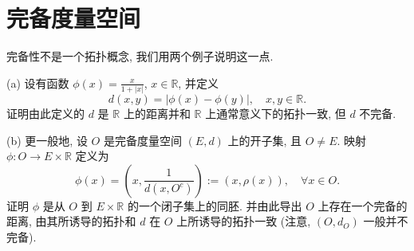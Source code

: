\chapter{完备度量空间}
\thispagestyle{empty}



\begin{exercise}
    完备性不是一个拓扑概念, 我们用两个例子说明这一点.

    (a) 设有函数 $\phi(x)=\frac{x}{1+|x|}$, $x\in\mathbb{R}$, 并定义
    \[d(x,y)=|\phi(x)-\phi(y)|,\quad x,y\in\mathbb{R}.\]
    证明由此定义的 $d$ 是 $\mathbb{R}$ 上的距离并和 $\mathbb{R}$ 上通常意义下的拓扑一致,
    但 $d$ 不完备.

    (b) 更一般地, 设 $O$ 是完备度量空间 $(E,d)$ 上的开子集, 且 $O\neq E$.
    映射 $\phi:O\to E\times\mathbb{R}$ 定义为
    \[\phi(x)=\left(x,\frac{1}{d(x,O^c)}\right):=(x,\rho(x)),\quad\forall x\in O.\]
    证明 $\phi$ 是从 $O$ 到 $E\times\mathbb{R}$ 的一个闭子集上的同胚.
    并由此导出 $O$ 上存在一个完备的距离,
    由其所诱导的拓扑和 $d$ 在 $O$ 上所诱导的拓扑一致 (注意, $(O,d_O)$ 一般并不完备).
\end{exercise}

